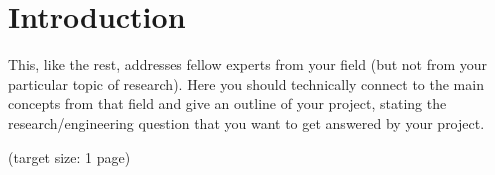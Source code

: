 
  \section{Introduction}

  This, like the rest, addresses fellow experts from your field (but
  not from your particular topic of research). Here you should
  technically connect to the main concepts from that field and give an
  outline of your project, stating the research/engineering question
  that you want to get answered by your project.

  (target size: 1 page)